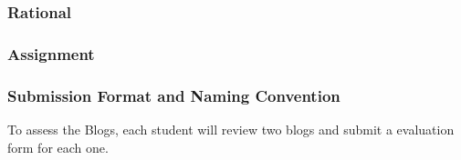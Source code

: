
\subsubsection{Rational}

\subsubsection{Assignment}

\subsubsection{Submission Format and Naming Convention}

To assess the Blogs, each student will review two blogs and submit a evaluation form for each one. 